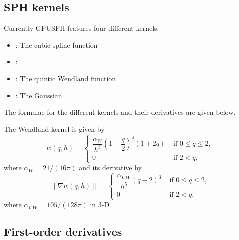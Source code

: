 \documentclass[12pt]{memoir}
\begin{document}
\subsection{SPH kernels}

Currently GPUSPH features four different kernels.
\begin{itemize}
  \item {}: The cubic spline function
  \item {}:
  \item {}: The quintic Wendland function
  \item {}: The Gaussian
\end{itemize}

The formulae for the different kernels and their derivatives are given below.

The Wendland kernel is given by
\begin{equation}
w(q,h) = \left\{ \begin{array}{rl}
 \dfrac{\alpha_W}{h^3} \left(1-\dfrac{q}{2}\right)^4(1+2q) &\mbox{ if $0\le q \le 2$,} \\
  0 &\mbox{ if $2 < q$,}
       \end{array} \right.
\label{e:sph:wendland}
\end{equation}
where $\alpha_W = 21/(16\pi)$ and its derivative by
\begin{equation}
\|\nabla w(q,h)\| = \left\{ \begin{array}{rl}
  \dfrac{\alpha_{\nabla W}}{h^5}\left(q-2\right)^3 &\mbox{ if $0\le q \le 2$,} \\
  0 &\mbox{ if $2 < q$,}
       \end{array} \right.
\label{e:sph:gradwendland}
\end{equation}
where $\alpha_{\nabla W} = 105/(128\pi)$ in 3-D.


\subsection{First-order derivatives}
\end{document}
